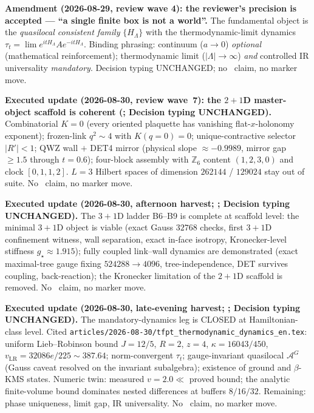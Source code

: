 \par\smallskip\noindent\textbf{Amendment (2026-08-29, review wave 4): the reviewer's precision
is accepted --- ``a single finite box is not a world''.}
The fundamental object is the \emph{quasilocal consistent family} $\{H_\Lambda\}$ with the
thermodynamic-limit dynamics
$\tau_t=\lim e^{itH_\Lambda}A e^{-itH_\Lambda}$.
Binding phrasing: continuum ($a\to0$) \emph{optional} (mathematical reinforcement);
thermodynamic limit ($|\Lambda|\to\infty$) \emph{and} controlled IR universality
\emph{mandatory}.  Decision typing UNCHANGED; no \mE\ claim, no marker move.

\par\smallskip\noindent\textbf{Executed update (2026-08-30, review wave~7): the $2{+}1$D
master-object scaffold is coherent
(; Decision
typing UNCHANGED).}
Combinatorial $K=0$ (every oriented plaquette has vanishing flat-$x$-holonomy exponent);
frozen-link $q^2\sim4$ with $K(q=0)=0$; unique-contractive selector $\lvert R'\rvert<1$;
QWZ wall $+$ DET4 mirror (physical slope $\approx-0.9989$, mirror gap $\ge1.5$ through
$t=0.6$); four-block assembly with $\mathbb Z_6$ content $(1,2,3,0)$ and clock
$[0,1,1,2]$.  $L=3$ Hilbert spaces of dimension $262144$ / $129024$ stay out of suite.
No \mE\ claim, no marker move.

\par\smallskip\noindent\textbf{Executed update (2026-08-30, afternoon harvest;
;
Decision typing UNCHANGED).}
The $3{+}1$D ladder B6--B9 is complete at scaffold level: the minimal $3{+}1$D object is
viable (exact Gauss $32768$ checks, first $3{+}1$D confinement witness, wall separation,
exact in-face isotropy, Kronecker-level stiffness $g_\star\approx1.915$); fully coupled
link--wall dynamics are demonstrated (exact maximal-tree gauge fixing
$524288\to4096$, tree-independence, DET survives coupling, back-reaction); the Kronecker
limitation of the $2{+}1$D scaffold is removed.  No \mE\ claim, no marker move.

\par\smallskip\noindent\textbf{Executed update (2026-08-30, late-evening harvest;
;
Decision typing UNCHANGED).}
The mandatory-dynamics leg is CLOSED at Hamiltonian-class level.  Cited
\texttt{articles/2026-08-30/tfpt\_thermodynamic\_dynamics\_en.tex}: uniform Lieb--Robinson
bound $J=12/5$, $R=2$, $z=4$, $\kappa=16043/450$, $v_{\mathrm{LR}}=32086e/225\sim387.64$;
norm-convergent $\tau_t$; gauge-invariant quasilocal $\mathcal A^G$ (Gauss caveat resolved
on the invariant subalgebra); existence of ground and $\beta$-KMS states.  Numeric twin:
measured $v=2.0\ll$ proved bound; the analytic finite-volume bound dominates nested
differences at buffers $8/16/32$.  Remaining: phase uniqueness, limit gap, IR universality.
No \mE\ claim, no marker move.

